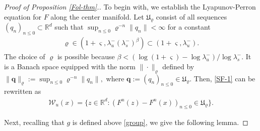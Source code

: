 \documentclass[reqno]{amsart}
\numberwithin{equation}{section}
\begin{document}
\begin{proof}[Proof of Proposition {\rm \ref{Fol-thm}.}]
To begin with,
we establish the Lyapunov-Perron equation for $F$   along the center manifold.
Let $\mathfrak{U}_\varrho$ consist of all sequences $(q_n)_{n\le 0}\subset \mathbb{R}^d$ such that $\sup_{n\le 0}\varrho^{-n}\|q_n\|<\infty$
for a constant
\begin{align}\label{va-1-u}
\varrho\in (1+\varsigma, \lambda_u^-(\lambda_s^-)^\beta)\subset (1+\varsigma, \lambda_u^-).
\end{align}
The choice of $\varrho$ is possible because $\beta<(\log(1+\varsigma)-\log\lambda_u^-)/\log\lambda_s^-$.
It is a Banach space equipped with the norm $\|\cdot\|_\varrho$ defined by
$
\|\mathbf{q}\|_{\varrho} :=\sup_{n\le 0}\varrho^{-n}\|q_n\|,
$
where $\mathbf{q}:=(q_n)_{n\le 0}\in\mathfrak{U}_\varrho$. Then,
\eqref{SF-1} can be rewritten as
\begin{align}\label{SF-2}
\mathcal{W}_u(x)=\Big\{z\in\mathbb{R}^d: (F^n(z)-F^n(x))_{n\le 0} \in \mathfrak{U}_{\varrho}\Big\}.
\end{align}

Next, recalling that $g$ is defined above \eqref{group}, we give the following lemma.


\end{proof}
\end{document}

